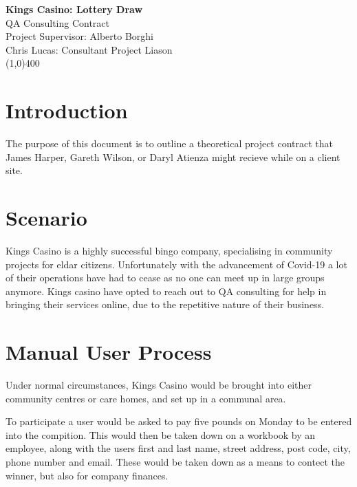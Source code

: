\documentclass[12]{article}
\begin{document}
\begin{titlepage}
\begin{center}
	
	\LARGE{\bf{Kings Casino: Lottery Draw}}\\
	[1cm]
	\large{QA Consulting Contract \\ Project Supervisor: Alberto Borghi}\\
	\large{Chris Lucas: Consultant Project Liason } \\
	[0.2cm]
	\line(1,0){400} \\
	
\end{center}


\end{titlepage}

\cleardoublepage

\section{Introduction} \label{sec:intro}

The purpose of this document is to outline a theoretical project contract that James Harper, Gareth Wilson, or Daryl Atienza might recieve while on a client site.
\\

\section{Scenario} \label{sec:intro}
Kings Casino is a highly successful bingo company, specialising in community projects for eldar citizens. Unfortunately with the advancement of Covid-19 a lot of their operations have had to cease as no one can meet up in large groups anymore. Kings casino have opted to reach out to QA consulting for help in bringing their services online, due to the repetitive nature of their business.

\section{Manual User Process}
Under normal circumstances, Kings Casino would be brought into either community centres or care homes, and set up in a communal area. 

To participate a user would be asked to pay five pounds on Monday to be entered into the compition. This would then be taken down on a workbook by an employee, along with the users first and last name, street address, post code, city, phone number and email. These would be taken down as a means to contect the winner, but also for company finances. 
\end{document}
